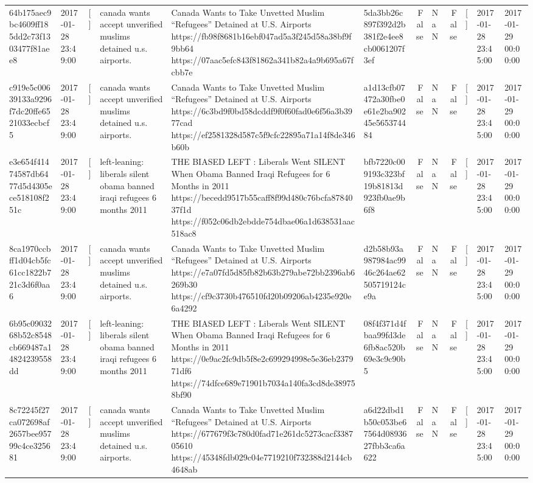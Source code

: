 \begin{tabular}{llllllrlrlll}
64b175aec9bc4609ff185dd2c73f1303477f81aee8 & 2017-01-28 23:49:00 & [] & canada wants accept unverified muslims detained u.s. airports. & Canada Wants to Take Unvetted Muslim “Refugees” Detained at U.S. Airports https://fb98f8681b16ebf047ad5a3f245d58a38bf9f9bb64 https://07aac5efc843f81862a341b82a4a9b695a67fcbb7e & 5da3bb26c897f392d2b381f2e4ee8cb0061207f3ef & False & NaN & False & [] & 2017-01-28 23:45:00 & 2017-01-29 00:00:00 \\
c919e5c00639133a9296f7dc20ffe6521033ecbcf5 & 2017-01-28 23:49:00 & [] & canada wants accept unverified muslims detained u.s. airports. & Canada Wants to Take Unvetted Muslim “Refugees” Detained at U.S. Airports https://6c3bd9f0bd58dcddf9f0f60fad0e6f56a3b3977cad https://ef2581328d587c5f9cfc22895a71a14f8de346b60b & a1d13cfb07472a30fbe0e61e2ba90245e565374484 & False & NaN & False & [] & 2017-01-28 23:45:00 & 2017-01-29 00:00:00 \\
e3e654f41474587db6477d5d4305ece518108f251c & 2017-01-28 23:49:00 & [] & left-leaning: liberals silent obama banned iraqi refugees 6 months 2011 & THE BIASED LEFT : Liberals Went SILENT When Obama Banned Iraqi Refugees for 6 Months in 2011 https://becedd9517b55caff8f99d480c76bcfa8784037f1d https://f052c06db2ebdde754dbae06a1d638531aac518ac8 & bfb7220c009193c323bf19b81813d923fb0ae9b6f8 & False & NaN & False & [] & 2017-01-28 23:45:00 & 2017-01-29 00:00:00 \\
8ca1970ccbff1d04cb5fc61cc1822b721c3d6f0aa6 & 2017-01-28 23:49:00 & [] & canada wants accept unverified muslims detained u.s. airports. & Canada Wants to Take Unvetted Muslim “Refugees” Detained at U.S. Airports https://e7a07fd5d85fb82b63b279abe72bb2396ab6269b30 https://cf9c3730b476510fd20b09206ab4235e920e6a4292 & d2b58b93a987984ac9946c264ae62505719124ce9a & False & NaN & False & [] & 2017-01-28 23:45:00 & 2017-01-29 00:00:00 \\
6b95c0903268b52c8548cb669487a14824239558dd & 2017-01-28 23:49:00 & [] & left-leaning: liberals silent obama banned iraqi refugees 6 months 2011 & THE BIASED LEFT : Liberals Went SILENT When Obama Banned Iraqi Refugees for 6 Months in 2011 https://0e9ac2fc9db5f8e2c699294998e5e36eb237971df6 https://74dfce689e71901b7034a140fa3cd8de389758bf90 & 08f4f371d4fbaa99fd3de6fb8ac520b69e3c9c90b5 & False & NaN & False & [] & 2017-01-28 23:45:00 & 2017-01-29 00:00:00 \\
8c72245f27ca072698af2657bee95799c4ce325681 & 2017-01-28 23:49:00 & [] & canada wants accept unverified muslims detained u.s. airports. & Canada Wants to Take Unvetted Muslim “Refugees” Detained at U.S. Airports https://677679f3c780d0fad71e261dc5273cacf338705610 https://45348fdb029c04e7719210f732388d2144cb4648ab & a6d22dbd1b50c053be67564d0893627fbb3ca6a622 & False & NaN & False & [] & 2017-01-28 23:45:00 & 2017-01-29 00:00:00 \\

\end{tabular}
